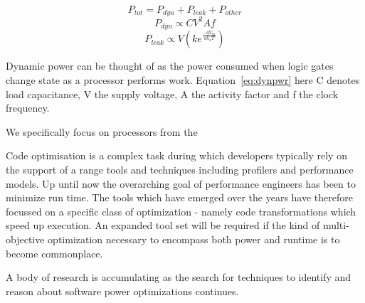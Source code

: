 \begin{equation}
\label{eq:totpwr}
P_{tot} = P_{dyn} + P_{leak} + P_{other}
\end{equation}
\begin{equation} 
\label{eq:dynpwr}
P_{dyn} \propto CV^{2}Af
\end{equation}
\begin{equation}
\label{eq:leakpwr}
P_{leak} \propto V\left(ke^{\frac{-qV_{th}}{ak_{a}T}}\right)
\end{equation}

Dynamic power can be thought of as the power consumed when logic gates change state as a processor performs work. Equation~\ref{eq:dynpwr} 
here C denotes load capacitance, V the supply voltage, A the activity factor and f the clock frequency.















 We specifically focus on processors from the



Code optimisation is a complex task during which developers typically rely on the support of a range tools and techniques including profilers and performance models. Up until now the overarching goal of performance engineers has been to minimize run time. The tools which have emerged over the years have therefore focussed on a specific class of optimization - namely code transformations which speed up execution. An expanded tool set will be required if the kind of multi-objective optimization necessary to encompass both power and runtime is to become commonplace.

A body of research is accumulating as the search for techniques to identify and reason about software power optimizations continues.
